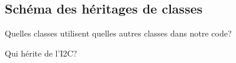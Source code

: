 \documentclass[10pt,a4paper,final]{article}
\begin{document}
\begin{spacing}{1.5}
\begin{figure}[hbtp]
\subsection{Schéma des héritages de classes}
Quelles classes utilisent quelles autres classes dans notre code?
\caption{Héritage de la classe de contrôle du véhicule}
\centering
{}
\caption{Héritage de la classe de contrôle de la station no.1}
\caption{Qui hérite du SPI?}
\caption{Qui hérite de l'I2C?}
\end{figure}

\vfill
\pagebreak




\end{spacing}
\end{document}
